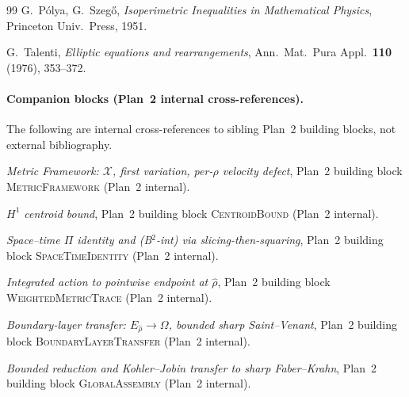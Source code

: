 \documentclass[11pt]{article}
\theoremstyle{definition}
\newcommand{\Om}{\Omega}
\begin{document}
\begin{thebibliography}{99}
 G.~P\'olya, G.~Szeg\H{o},
\emph{Isoperimetric Inequalities in Mathematical Physics}, Princeton
Univ.\ Press, 1951.

 G.~Talenti,
\emph{Elliptic equations and rearrangements}, Ann.\ Mat.\ Pura Appl.\
\textbf{110} (1976), 353--372.

\paragraph{Companion blocks (Plan~2 internal cross-references).}
The following are internal cross-references to sibling Plan~2
building blocks, not external bibliography.

 \emph{Metric Framework: $\mathcal X$,
first variation, per-$\rho$ velocity defect}, Plan~2 building block
\textsc{MetricFramework} (Plan~2 internal).

 \emph{$H^{1}$ centroid bound}, Plan~2 building
block \textsc{CentroidBound} (Plan~2 internal).

 \emph{Space--time $\Pi$ identity and
(B$^{2}$-int) via slicing-then-squaring}, Plan~2 building block
\textsc{SpaceTimeIdentity} (Plan~2 internal).

 \emph{Integrated action to pointwise
endpoint at $\widehat\rho$}, Plan~2 building block
\textsc{WeightedMetricTrace} (Plan~2 internal).

 \emph{Boundary-layer transfer:
$E_{\widehat\rho}\to\Om$, bounded sharp Saint--Venant}, Plan~2 building
block \textsc{BoundaryLayerTransfer} (Plan~2 internal).

 \emph{Bounded reduction and Kohler--Jobin
transfer to sharp Faber--Krahn}, Plan~2 building block
\textsc{GlobalAssembly} (Plan~2 internal).

\end{thebibliography}
\end{document}
